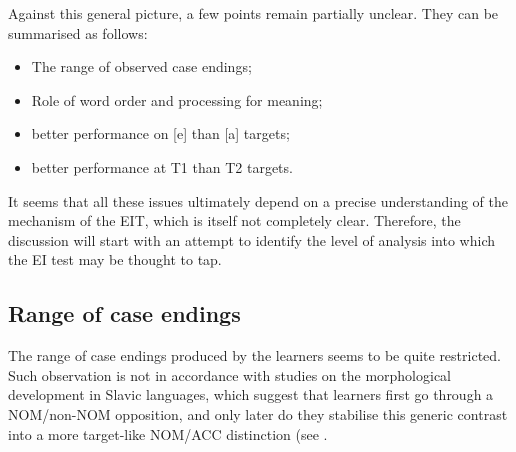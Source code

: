 Against this general picture, a few points remain partially unclear. They can be summarised as follows:

\begin{itemize}
    \item The range of observed case endings;
    \item Role of word order and processing for meaning;
    \item better performance on [e] than [a] targets;
    \item better performance at T1 than T2 targets.
\end{itemize}

It seems that all these issues ultimately depend on a precise understanding of the mechanism of the EIT, which is itself not completely clear. Therefore, the discussion will start with an attempt to identify the level of analysis into which the EI test may be thought to tap. 

\subsection{Range of case endings}\label{sec:08:2.1}

The range of case endings produced by the learners seems to be quite restricted. Such observation is not in accordance with studies on the morphological development in Slavic languages, which suggest that learners first go through a NOM/non-NOM opposition, and only later do they stabilise this generic contrast into a more target-like NOM/ACC distinction (see .

